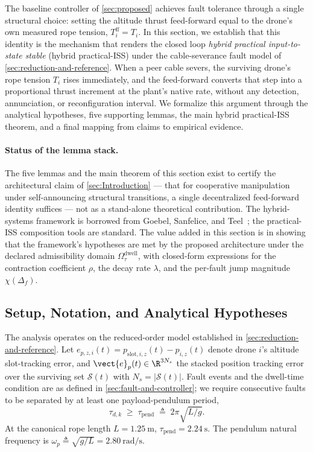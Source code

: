 The baseline controller of \cref{sec:proposed} achieves fault tolerance through a single structural choice: setting the altitude thrust feed-forward equal to the drone's own measured rope tension, $T_i^{\mathrm{ff}} = T_i$. In this section, we establish that this identity is the mechanism that renders the closed loop \emph{hybrid practical input-to-state stable} (hybrid practical-ISS) under the cable-severance fault model of \cref{sec:reduction-and-reference}. When a peer cable severs, the surviving drone's rope tension $T_i$ rises immediately, and the feed-forward converts that step into a proportional thrust increment at the plant's native rate, without any detection, annunciation, or reconfiguration interval. We formalize this argument through the analytical hypotheses, five supporting lemmas, the main hybrid practical-ISS theorem, and a final mapping from claims to empirical evidence.

\paragraph{Status of the lemma stack.} The five lemmas and the main theorem of this section exist to certify the architectural claim of \cref{sec:Introduction} --- that for cooperative manipulation under self-announcing structural transitions, a single decentralized feed-forward identity suffices --- not as a stand-alone theoretical contribution. The hybrid-systems framework is borrowed from Goebel, Sanfelice, and Teel~\cite{GoebelSanfeliceTeel2012}; the practical-ISS composition tools are standard. The value added in this section is in showing that the framework's hypotheses are met by the proposed architecture under the declared admissibility domain $\Omega_\tau^{\mathrm{dwell}}$, with closed-form expressions for the contraction coefficient $\rho$, the decay rate $\lambda$, and the per-fault jump magnitude $\chi(\Delta_f)$.

\subsection{Setup, Notation, and Analytical Hypotheses}
\label{sec:stability-setup}

The analysis operates on the reduced-order model established in \cref{sec:reduction-and-reference}. Let $e_{p,z,i}(t) = p_{\mathrm{slot},i,z}(t) - p_{i,z}(t)$ denote drone $i$'s altitude slot-tracking error, and $\vect{e}_p(t) \in \R^{3N_s}$ the stacked position tracking error over the surviving set $\mathcal{S}(t)$ with $N_s = |\mathcal{S}(t)|$. Fault events and the dwell-time condition are as defined in \cref{sec:fault-and-controller}; we require consecutive faults to be separated by at least one payload-pendulum period,
\begin{equation}
  \tau_{d,k} \;\ge\; \tau_{\mathrm{pend}}
    \;\triangleq\; 2\pi\sqrt{L/g}.
  \label{eq:dwell-condition}
\end{equation}
At the canonical rope length $L = \SI{1.25}{\metre}$, $\tau_{\mathrm{pend}} = \SI{2.24}{\second}$. The pendulum natural frequency is $\omega_p \triangleq \sqrt{g/L} = \SI{2.80}{\radian\per\second}$.

